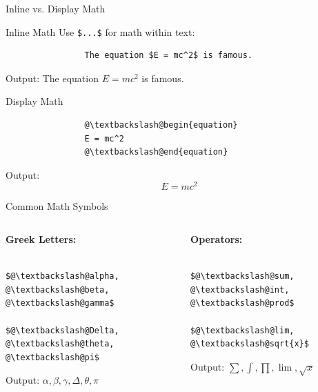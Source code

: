\documentclass[aspectratio=169]{beamer}
\begin{document}
	\begin{frame}[fragile]{Inline vs. Display Math}
		\begin{block}{Inline Math}
			Use \texttt{\$...\$} for math within text:
			\begin{lstlisting}
				The equation $E = mc^2$ is famous.
			\end{lstlisting}
			Output: The equation $E = mc^2$ is famous.
		\end{block}
		
		\vspace{1em}
		
		\begin{block}{Display Math}
			\begin{lstlisting}
				@\textbackslash@begin{equation}
				E = mc^2
				@\textbackslash@end{equation}
			\end{lstlisting}
			Output:
			\begin{equation}
				E = mc^2
			\end{equation}
		\end{block}
	\end{frame}
	
	\begin{frame}[fragile]{Common Math Symbols}
		\begin{columns}[t]
			\begin{column}{0.48\textwidth}
				\textbf{Greek Letters:}
				\begin{lstlisting}
					$@\textbackslash@alpha, @\textbackslash@beta, @\textbackslash@gamma$
					$@\textbackslash@Delta, @\textbackslash@theta, @\textbackslash@pi$
				\end{lstlisting}
				Output: $\alpha, \beta, \gamma, \Delta, \theta, \pi$
			\end{column}
			
			\begin{column}{0.48\textwidth}
				\textbf{Operators:}
				\begin{lstlisting}
					$@\textbackslash@sum, @\textbackslash@int, @\textbackslash@prod$
					$@\textbackslash@lim, @\textbackslash@sqrt{x}$
				\end{lstlisting}
				Output: $\sum, \int, \prod, \lim, \sqrt{x}$
			\end{column}
		\end{columns}
	\end{frame}
	
\end{document}
